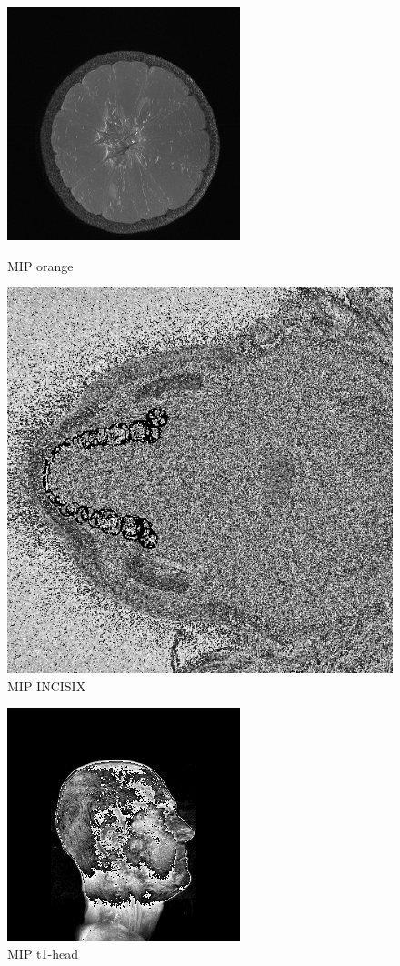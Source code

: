 \documentclass{article}
\begin{document}
\begin{figure}[h]
\centerline{\includegraphics[scale=0.6]{./sortieorange.png}}
\caption{MIP orange}

\centerline{\includegraphics[scale=0.4]{./sortieINCISIX.png}}
\caption{MIP INCISIX}
\end{figure}


\begin{figure}[h]
\centerline{\includegraphics[scale=0.7]{./sortiet1head.png}}
\caption{MIP t1-head}
\end{figure}
\end{document}
